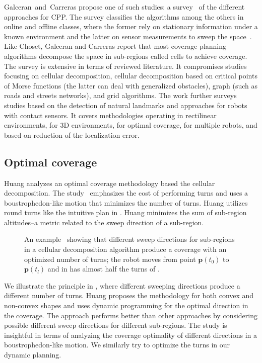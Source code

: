 Galceran~and~Carreras propose one of such studies: a survey~\citep{galceran2013survey} of the different approaches for CPP. The survey classifies the algorithms among the others in online and offline classes, where the former rely on stationary information under a known environment and the latter on sensor measurements to sweep the space~\citep{galceran2013survey}. Like Choset, Galceran and Carreras report that most coverage planning algorithms decompose the space in sub-regions called cells to achieve coverage. The survey is extensive in terms of reviewed literature. It compromises studies focusing on cellular decomposition, cellular decomposition based on critical points of Morse functions (the latter can deal with generalized obstacles), graph (such as roads and streets networks), and grid algorithms. The work further surveys studies based on the detection of natural landmarks and approaches for robots with contact sensors. It covers methodologies operating in rectilinear environments, for 3D environments, for optimal coverage, for multiple robots, and based on reduction of the localization error.

\subsection{Optimal coverage}
\label{sec:opti-cov}

Huang analyzes an optimal coverage methodology based the cellular decomposition. The study~\citep{huang2001optimal} emphasizes the cost of performing turns and uses a boustrophedon-like motion that minimizes the number of turns. Huang utilizes round turns like the intuitive plan in . Huang minimizes the sum of sub-region altitudes--a metric related to the sweep direction of a sub-region. 
\begin{figure}[h]
  \centering
  \selectfont
  
  \caption[Turn optimal coverage with different sweep directions for each sub-region.]{An example~\citep{huang2001optimal} showing that different sweep directions for sub-regions in a cellular decomposition algorithm produce a coverage with an optimized number of turns; the robot moves from point $\mathbf{p}(t_0)$ to $\mathbf{p}(t_l)$ and in  has almost half the turns of .}
  \label{fig:huang}
\end{figure}
We illustrate the principle in , where different sweeping directions produce a different number of turns. Huang proposes the methodology for both convex and non-convex shapes and uses dynamic programming for the optimal direction in the coverage. The approach performs better than other approaches by considering possible different sweep directions for different sub-regions. The study is insightful in terms of analyzing the coverage optimality of different directions in a boustrophedon-like motion. We similarly try to optimize the turns in our dynamic planning.

